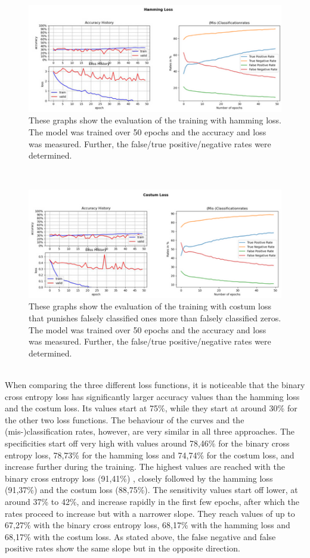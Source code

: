 \begin{figure}[h]
	\centering
	\includegraphics[scale=0.8]{Figures/chapter04/multi_ham}
	\decoRule
	\caption[Hamming Loss]{These graphs show the evaluation of the training with hamming loss. The model was trained over 50 epochs and the accuracy and loss was measured. Further, the false/true positive/negative rates were determined.}
	\label{fig:MultilabelHammingLoss}
\end{figure}
\\
\begin{figure}[h]
	\centering
	\includegraphics[scale=0.8]{Figures/chapter04/multi_costum}
	\decoRule
	\caption[Costum Loss]{These graphs show the evaluation of the training with costum loss that punishes falsely classified ones more than falsely classified zeros. The model was trained over 50 epochs and the accuracy and loss was measured. Further, the false/true positive/negative rates were determined.}
	\label{fig:MultilabelCostumLoss}
\end{figure}
\\
When comparing the three different loss functions, it is noticeable that the binary cross entropy loss has significantly larger accuracy values than the hamming loss and the costum loss. Its values start at 75\%, while they start at around 30\% for the other two loss functions. The behaviour of the curves and the (mis-)classification rates, however, are very similar in all three approaches. The specificities start off very high with values around 78,46\% for the binary cross entropy loss, 78,73\% for the hamming loss and 74,74\% for the costum loss, and increase further during the training. The highest values are reached with the binary cross entropy loss (91,41\%) , closely followed by the hamming loss (91,37\%) and the costum loss (88,75\%). The sensitivity values start off lower, at around 37\% to 42\%, and increase rapidly in the first few epochs, after which the rates proceed to increase but with a narrower slope. They reach values of up to 67,27\% with the binary cross entropy loss, 68,17\% with the hamming loss and 68,17\% with the costum loss. As stated above, the false negative and false positive rates show the same slope but in the opposite direction. \\
